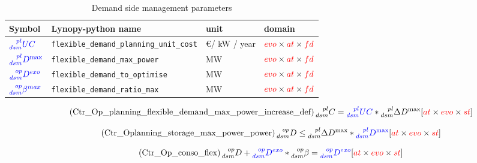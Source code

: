 \documentclass[a4paper,11pt]{article}
\begin{document}
\begin{table}[h]
\footnotesize
\centering

\caption{Demand side management parameters}
\begin{tabular}{llll}
\hline
    \textbf{Symbol} & \textbf{Lynopy-python name} & \textbf{unit}  & \textbf{domain} \\ \hline
    
    $\textcolor{blue}{\prescript{pl}{dsm}{UC}}$&  \verb|flexible_demand_planning_unit_cost| & \euro / kW / year & $\textcolor{red}{evo}  \times \textcolor{red}{at} \times \textcolor{red}{fd} $ \\ 
    
    $\textcolor{blue}{\prescript{pl}{dsm}{D}^{\max}}$&  \verb|flexible_demand_max_power| & MW & $\textcolor{red}{evo}  \times \textcolor{red}{at} \times \textcolor{red}{fd} $ \\ 

    $\textcolor{blue}{\prescript{op}{dsm}{D^{exo}}}$&  \verb|flexible_demand_to_optimise| & MW & $\textcolor{red}{evo}  \times \textcolor{red}{at} \times \textcolor{red}{fd} $ \\ 
    
    $\textcolor{blue}{\prescript{op}{dsm}{\beta^{max}}}$&  \verb|flexible_demand_ratio_max| & MW & $\textcolor{red}{evo}  \times \textcolor{red}{at} \times \textcolor{red}{fd} $ \\ 
  \end{tabular}
\end{table}

\begin{equation} \tag{Ctr\_Op\_planning\_flexible\_demand\_max\_power\_increase\_def}
 \prescript{pl}{dsm}{C} = \textcolor{blue}{\prescript{pl}{dsm}{UC}}   * \prescript{pl}{dsm}{\Delta D^{\max}} \hfill [\textcolor{red}{at} \times \textcolor{red}{evo} \times \textcolor{red}{st}]
\label{eq:Ctr_Op_planning_flexible_demand_max_power_increase_def}
\end{equation}

\begin{equation} \tag{Ctr\_Oplanning\_storage\_max\_power\_power}
 \prescript{op}{dsm}{D} \leq  \prescript{pl}{dsm}{\Delta D^{\max}} *\textcolor{blue}{\prescript{pl}{dsm}{D}^{\max}} \hfill [\textcolor{red}{at} \times \textcolor{red}{evo} \times \textcolor{red}{st}]
\label{eq:Ctr_Oplanning_storage_max_power_power}
\end{equation}


\begin{equation} \tag{Ctr\_Op\_conso\_flex}
 \prescript{op}{dsm}{D} + \textcolor{blue}{\prescript{op}{dsm}{D^{exo}}} * \prescript{op}{dsm}{\beta} = \textcolor{blue}{\prescript{op}{dsm}{D^{exo}}} \hfill [\textcolor{red}{at} \times \textcolor{red}{evo} \times \textcolor{red}{st}]
\label{eq:Ctr_Op_conso_flex}
\end{equation}
\end{document}
